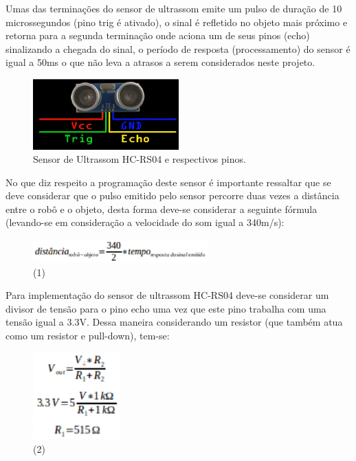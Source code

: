 Umas das terminações do sensor de ultrassom emite um pulso de duração de 10 microssegundos (pino trig é ativado), o sinal é 
refletido no objeto mais próximo e retorna para a segunda terminação onde aciona um de seus pinos (echo) sinalizando a chegada do sinal,
o período de resposta (processamento) do sensor é igual a 50ms o que não leva a atrasos a serem considerados neste projeto.

\begin{figure}[H]
    \centering
    \includegraphics[width=0.5\textwidth]{figuras/pinos_ultrassom.eps}
    \caption{Sensor de Ultrassom HC-RS04 e respectivos pinos.}
    \label{fig:pinos_ultrassom}
\end{figure}

No que diz respeito a programação deste sensor é importante ressaltar que se deve considerar que o pulso emitido pelo sensor percorre
duas vezes a distância entre o robô e o objeto, desta forma deve-se considerar a seguinte fórmula (levando-se em consideração a velocidade
do som igual a 340m/s):

\begin{figure}[H]
    \centering
    \includegraphics[width=0.6\textwidth]{figuras/distancia.eps}
    \caption{(1)}
    \label{fig:distancia_sensor}
\end{figure}

Para implementação do sensor de ultrassom HC-RS04 deve-se considerar um divisor de tensão para o pino echo uma vez que este pino
trabalha com uma tensão igual a 3.3V. Dessa maneira considerando um resistor (que também atua como um resistor e pull-down), tem-se:

\begin{figure}[H]
    \centering
    \includegraphics[width=0.3\textwidth]{figuras/vout.eps}
    \caption{(2)}
    \label{fig:vout}
\end{figure}

